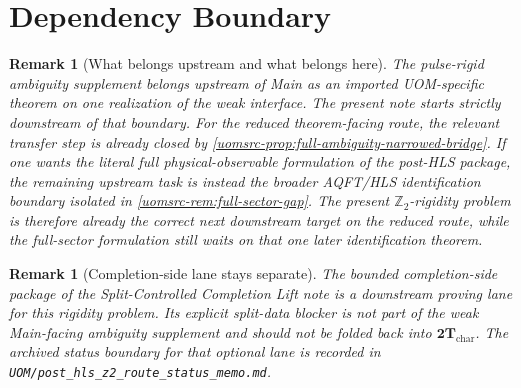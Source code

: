 \documentclass[11pt]{article}
\newtheorem{remark}[theorem]{Remark}
\theoremstyle{definition}
\begin{document}
\section{Dependency Boundary}

\begin{remark}[What belongs upstream and what belongs here]
The pulse-rigid ambiguity supplement belongs upstream of Main as an imported UOM-specific theorem on
one realization of the weak interface.
The present note starts strictly downstream of that boundary.
For the reduced theorem-facing route, the relevant transfer step is already closed by
\textup{\cref{uomsrc-prop:full-ambiguity-narrowed-bridge}}.
If one wants the literal full physical-observable formulation of the post-HLS package, the
remaining upstream task is instead the broader AQFT/HLS identification boundary isolated in
\textup{\cref{uomsrc-rem:full-sector-gap}}.
The present \(\mathbb Z_2\)-rigidity problem is therefore already the correct next downstream target
on the reduced route, while the full-sector formulation still waits on that one later identification
theorem.
\end{remark}

\begin{remark}[Completion-side lane stays separate]
The bounded completion-side package of the Split-Controlled Completion Lift note is a downstream
proving lane for this rigidity problem.
Its explicit split-data blocker is not part of the weak Main-facing ambiguity supplement and should
not be folded back into \(\mathbf{2T}_{\mathrm{char}}\).
The archived status boundary for that optional lane is recorded in
\texttt{UOM/post\_hls\_z2\_route\_status\_memo.md}.
\end{remark}
\end{document}
